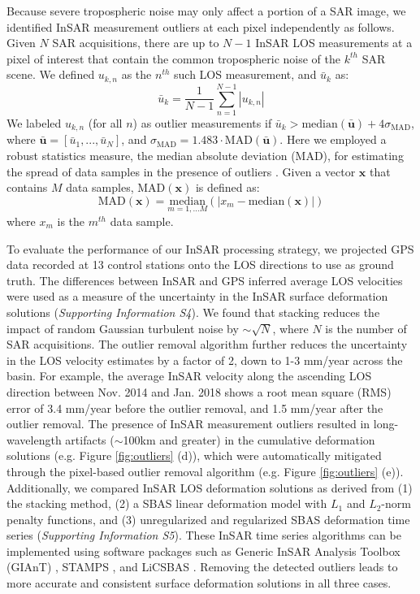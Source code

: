 \documentclass[draft]{agujournal2019}
\begin{document}
Because severe tropospheric noise may only affect a portion of a SAR image, we identified InSAR measurement outliers at each pixel independently as follows. Given $N$ SAR acquisitions, there are up to $N-1$ InSAR LOS measurements at a pixel of interest that contain the common tropospheric noise of the $k^{th}$ SAR scene. We defined $u_{k,n}$ as the $n^{th}$ such LOS measurement, and $\bar{u}_k$ as:
\begin{equation}
\bar{u}_k  = \frac{1}{N-1} \sum_{n=1}^{N-1} |u_{k,n}|  
\end{equation}
We labeled $u_{k,n}$ (for all $n$) as outlier measurements if $\bar{u}_k > \mathrm{median}(\mathbf{\bar{u}}) + 4 \sigma_{\mathrm{MAD}}$, where $\mathbf{\bar{u}}=[\bar{u}_1,...,\bar{u}_N]$, and $\sigma_{\mathrm{MAD}}=1.483 \cdot \mathrm{MAD}(\mathbf{\bar{u}})$. Here we employed a robust statistics measure, the median absolute deviation (MAD), for estimating the spread of data samples in the presence of outliers \cite{Hampel1974, Rousseeuw2011}. Given a vector $\mathbf{x}$ that contains $M$ data samples, $\mathrm{MAD}(\mathbf{x})$ is defined as:
\begin{equation}
  \mathrm{MAD}(\mathbf{x}) =  \underset{m = 1,\ldots M}{\mathrm{median}} \left( \bigr\lvert  x_m - \mathrm{median}(\mathbf{x})  \bigr\rvert \right)
\end{equation}
where $x_m$ is the $m^{th}$ data sample. 

To evaluate the performance of our InSAR processing strategy, we projected GPS data recorded at 13 control stations onto the LOS directions to use as ground truth. The differences between InSAR and GPS inferred average LOS velocities were used as a measure of the uncertainty in the InSAR surface deformation solutions (\textit{Supporting Information S4}). We found that stacking reduces the impact of random Gaussian turbulent noise by $ \sim \sqrt{N} $, where $ N $ is the number of SAR acquisitions. The outlier removal algorithm further reduces the uncertainty in the LOS velocity estimates by a factor of 2, down to 1-3 mm/year across the basin. For example, the average InSAR velocity along the ascending LOS direction between Nov. 2014 and Jan. 2018 shows a root mean square (RMS) error of 3.4 mm/year before the outlier removal, and 1.5 mm/year after the outlier removal. The presence of InSAR measurement outliers resulted in long-wavelength artifacts ($ \sim $100km and greater) in the cumulative deformation solutions (e.g. Figure \ref{fig:outliers} (d)), which were automatically mitigated through the pixel-based outlier removal algorithm (e.g. Figure \ref{fig:outliers} (e)). Additionally, we compared InSAR LOS deformation solutions as derived from (1) the stacking method, (2) a SBAS linear deformation model with $L_1$ and $L_2$-norm penalty functions, and (3) unregularized and regularized SBAS deformation time series (\textit{Supporting Information S5}). These InSAR time series algorithms can be implemented using software packages such as Generic InSAR Analysis Toolbox (GIAnT) \cite{agram2013new}, STAMPS \cite{hooper2012recent}, and LiCSBAS \cite{morishita2020licsbas}. Removing the detected outliers leads to more accurate and consistent surface deformation solutions in all three cases.
\end{document}

